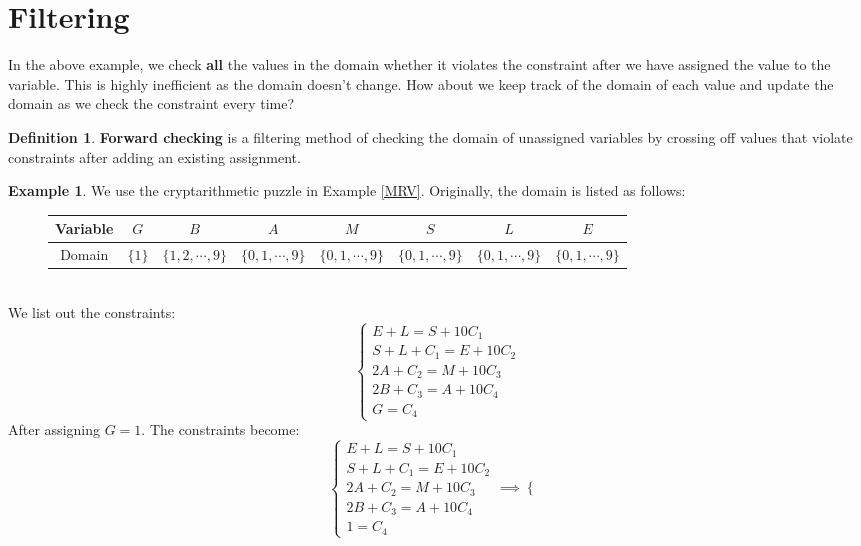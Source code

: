\documentclass{article}
\theoremstyle{definition}
\newtheorem{definition}{Definition}[section]
\newtheorem{example}{Example}[definition]
\begin{document}
\section{Filtering}
In the above example, we check \textbf{all} the values in the domain whether it violates the constraint after we have assigned the value to the variable. This is highly inefficient as the domain doesn't change. How about we keep track of the domain of each value and update the domain as we check the constraint every time?
\begin{definition}
	\textbf{Forward checking} is a filtering method of checking the domain of unassigned variables by crossing off values that violate constraints after adding an existing assignment. 
\end{definition}
\begin{example}
	\label{Forward checking}
	We use the cryptarithmetic puzzle in Example \ref{MRV}. Originally, the domain is listed as follows:
	\begin{figure}[h]
		\centering
		\begin{tabular}{|c||c|c|c|c|c|c|c|}
			\hline
			Variable & $G$ & $B$ & $A$ & $M$ & $S$ & $L$ & $E$\\
			\hline
			Domain & $\{1\}$ & $\{1,2,\cdots,9\}$ & $\{0,1,\cdots,9\}$ & $\{0,1,\cdots,9\}$ & $\{0,1,\cdots,9\}$ & $\{0,1,\cdots,9\}$ & $\{0,1,\cdots,9\}$\\
			\hline
		\end{tabular}
	\end{figure}\\
	We list out the constraints:
	\begin{equation*}
		\begin{cases}
			E+L=S+10C_{1}\\
			S+L+C_{1}=E+10C_{2}\\
			2A+C_{2}=M+10C_{3}\\
			2B+C_{3}=A+10C_{4}\\
			G=C_{4}
		\end{cases}
	\end{equation*}
	After assigning $G=1$. The constraints become:
	\begin{equation*}
		\begin{cases}
			E+L=S+10C_{1}\\
			S+L+C_{1}=E+10C_{2}\\
			2A+C_{2}=M+10C_{3}\\
			2B+C_{3}=A+10C_{4}\\
			1=C_{4}
		\end{cases}\implies\begin{cases}

\end{cases}
\end{equation*}
\end{example}
\end{document}
